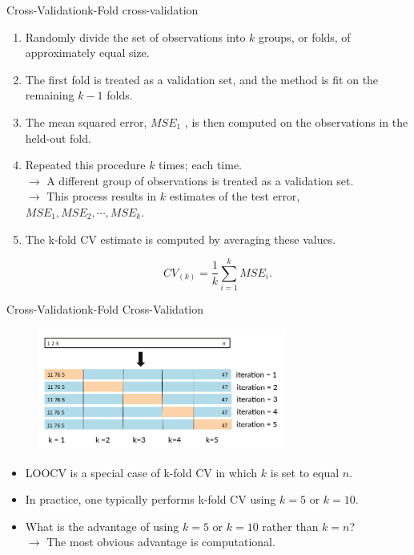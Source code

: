 \begin{frame}{Cross-Validation}{k-Fold cross-validation}

\begin{enumerate}
    \item Randomly divide the set of observations into $k$ groups, or folds, of approximately equal size.  \pause 
    
    \item The first fold is treated as a validation set, and the method is fit on the remaining $k - 1$ folds.  \pause 
    
    \item The mean squared error, $MSE_1$ , is then computed on the observations in the held-out fold.  \pause 
    
    \item Repeated this procedure $k$ times; each time. \\ \pause 
    $\rightarrow$ A diﬀerent group of observations is treated as a validation set. \\ \pause
    $\rightarrow$ This process results in $k$ estimates of the test error, $MSE_1 , MSE_2 , \cdots , MSE_k$.  \pause 
    
    \item The k-fold CV estimate is computed by averaging these values.

    \begin{equation}
        CV_{(k)} = \frac{1}{k} \sum_{i=1}^k MSE_i. 
    \end{equation}
\end{enumerate}
    
\end{frame}

\begin{frame}{Cross-Validation}{k-Fold Cross-Validation}

\begin{figure}
    \centering
    \includegraphics[height=4cm]{cross-val/kfold.png}
\end{figure} \pause 


\begin{itemize}
    \item LOOCV is a special case of k-fold CV in which $k$
is set to equal $n$. \pause 
    \item In practice, one typically performs k-fold CV using $k = 5$ or $k = 10$. \pause 
    \item What is the advantage of using $k = 5$ or $k = 10$ rather than $k = n$? \pause \\
    $\rightarrow$ The most obvious advantage is computational. 
    
\end{itemize}
    
\end{frame}

